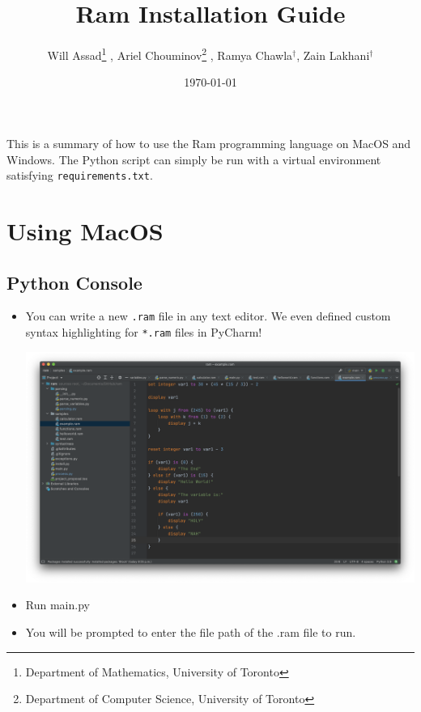 \documentclass[11pt]{article}
\title{Ram Installation Guide}
\author{Will Assad\footnote{Department of Mathematics, University of Toronto} , Ariel Chouminov\footnote{Department of Computer Science, University of Toronto} , Ramya Chawla$^\dag$, Zain Lakhani$^\dag$}
\date{\today}
\begin{document}
\maketitle

\noindent This is a summary of how to use the Ram programming language on MacOS and Windows. The Python script can simply be run with a virtual environment satisfying \texttt{requirements.txt}.

\section{Using MacOS}

\subsection*{Python Console}

    \begin{itemize}
        \item You can write a new \texttt{.ram} file in any text editor. We even defined custom syntax highlighting for \texttt{*.ram} files in PyCharm! 
            
        \begin{center}
            \includegraphics[scale=0.18]{terminal5.png}
        \end{center}
            
        \item Run main.py
            
        \item You will be prompted to enter the file path of the .ram file to run.
            
        \bigskip
            
        \bigskip        
        
        \newpage
        
    \end{itemize}
    
\end{document}
